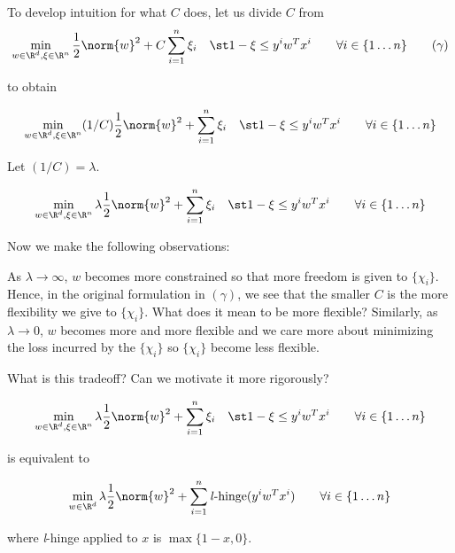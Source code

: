 \documentclass[../main.tex]{subfiles}
\begin{document}
\begin{remark}
    To develop intuition for what $C$ does, let us divide $C$ from
    \[
        \min_{w \in \R^d, \xi \in \R^n} \frac{1}{2}\norm{w}^2 + C\sum_{i=1}^{n}\xi_{i} \quad \st 1 - \xi \leq y^{i}w^Tx^{i} \qquad \forall i \in \{1 \dots n\} \tag{$\gamma$}\\
    \]

    to obtain

    \[
        \min_{w \in \R^d, \xi \in \R^n} (1/C)\frac{1}{2}\norm{w}^2 + \sum_{i=1}^{n}\xi_{i} \quad \st 1 - \xi \leq y^{i}w^Tx^{i} \qquad \forall i \in \{1 \dots n\} \\
    \]
    
    Let $(1/C) = \lambda$.

    \[
        \min_{w \in \R^d, \xi \in \R^n} \lambda\frac{1}{2}\norm{w}^2 + \sum_{i=1}^{n}\xi_{i} \quad \st 1 - \xi \leq y^{i}w^Tx^{i} \qquad \forall i \in \{1 \dots n\} \\
    \]

    Now we make the following observations:

    \begin{outline}
        \1 As $\lambda \to \infty$, $w$ becomes more constrained so that more freedom is
        given to $\{\chi_{i}\}.$ Hence, in the original formulation in $(\gamma)$, we see that
        the smaller $C$ is the more flexibility we give to $\{\chi_{i}\}$. What does it mean
        to be more flexible? Similarly, as $\lambda \to 0$, $w$ becomes more and more flexible and
        we care more about minimizing the loss incurred by the $\{\chi_{i}\}$ so $\{\chi_{i}\}$ become less flexible.
    \end{outline}

    \begin{unresolved}
        What is this tradeoff? Can we motivate it more rigorously?
    \end{unresolved}
\end{remark}

\begin{theorem}
    \[
        \min_{w \in \R^d, \xi \in \R^n} \lambda\frac{1}{2}\norm{w}^2 + \sum_{i=1}^{n}\xi_{i} \quad \st 1 - \xi \leq y^{i}w^Tx^{i} \qquad \forall i \in \{1 \dots n\} \\
    \]

    is equivalent to

    \[
        \min_{w \in \R^d} \lambda\frac{1}{2}\norm{w}^2 + \sum_{i=1}^{n}\text{\textit{l}-hinge}(y^{i}w^Tx^{i}) \qquad \forall i \in \{1 \dots n\} \\
    \]

    where \textit{l}-hinge applied to $x$ is $\max\{1 - x, 0\}$.

\end{theorem}
\end{document}
